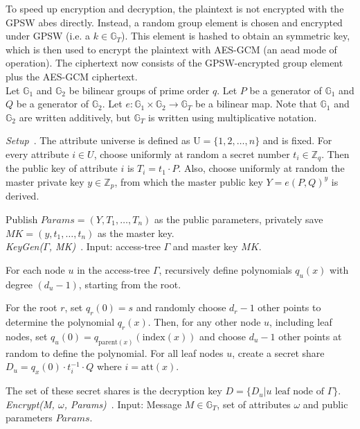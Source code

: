 To speed up encryption and decryption, the plaintext is not encrypted with the GPSW \acrshort{abes} directly.
Instead, a random group element is chosen and encrypted under GPSW (i.e. a $k \in \mathbb{G}_T$).
This element is hashed to obtain an symmetric key, which is then used to encrypt the plaintext with AES-GCM (an \acrshort{aead} mode of operation).
The ciphertext now consists of the GPSW-encrypted group element plus the AES-GCM ciphertext.
\\
Let $\mathbb{G}_1$ and $\mathbb{G}_2$ be bilinear groups of prime order $q$. Let $P$ be a generator of $\mathbb{G}_1$ and $Q$ be a generator of $\mathbb{G}_2$. Let $e: \mathbb{G}_1 \times \mathbb{G}_2 \rightarrow \mathbb{G}_T$ be a bilinear map.
Note that $\mathbb{G}_1$ and $\mathbb{G}_2$ are written additively, but $\mathbb{G}_T$ is written using multiplicative notation.

\emph{Setup}~\cite{goyal_attribute-based_2006}.
The attribute universe is defined as $\text{U} = \{1, 2, \dots, n\}$ and is fixed.
For every attribute $i \in U$, choose uniformly at random a secret number $t_i \in \mathbb{Z}_q$.
Then the public key of attribute $i$ is $T_i = t_1 \cdot P$.
Also, choose uniformly at random the master private key $y \in \mathbb{Z}_p$, from which the master public key $Y = e(P, Q)^y$ is derived.

Publish $Params=(Y, T_1, \dots, T_n)$ as the public parameters, privately save $MK = (y, t_1, \dots, t_n)$ as the master key.
\\

\emph{KeyGen($\Gamma$, MK)}~\cite{goyal_attribute-based_2006}.
Input: \gls{access-tree} $\Gamma$ and master key $MK$.

For each node $u$ in the \gls{access-tree} $\Gamma$, recursively define polynomials $q_u(x)$ with degree $(d_u - 1)$, starting from the root.

For the root $r$, set $q_r(0) = s$ and randomly choose $d_r -1$ other points to determine the polynomial $q_r(x)$.
Then, for any other node $u$, including leaf nodes, set $q_u(0) = q_{\text{parent}(x)}(\text{index}(x))$ and choose $d_u -1$ other points at random to define the polynomial. 
For all leaf nodes $u$, create a secret share $D_u = q_x(0) \cdot t_i^{-1} \cdot Q$ where $i = \text{att}(x)$.

The set of these secret shares is the decryption key $D = \{D_u | u \text{ leaf node of } \Gamma\}$.\\

\emph{Encrypt(M, $\omega$, Params)}~\cite{goyal_attribute-based_2006}.
Input: Message $M \in \mathbb{G}_T$, set of \glspl{attribute} $\omega$ and public parameters $Params$. 

